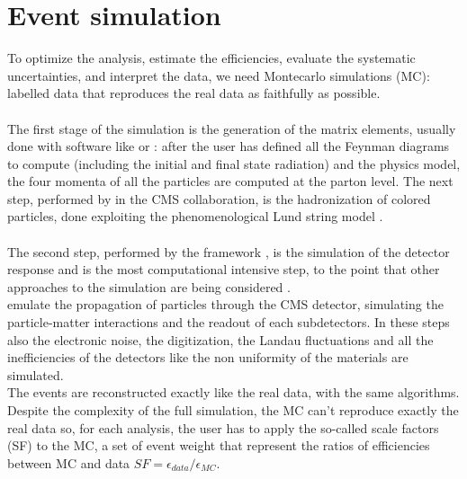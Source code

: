 \section{Event simulation}
To optimize the analysis, estimate the efficiencies, evaluate the systematic uncertainties, and interpret the data, we need Montecarlo simulations (MC): labelled data that reproduces the real data as faithfully as possible.\\
\\
The first stage of the simulation is the generation of the matrix elements, usually done with software like \MADGRAPH \ADDREF or \POWHEG \ADDREF : after the user has defined all the Feynman diagrams to compute (including the initial and final state radiation) and the physics model, the four momenta of all the particles are computed at the parton level.
The next step, performed by \PYTHIA \ADDREF in the CMS collaboration, is the hadronization of colored particles, done exploiting the phenomenological Lund string model \ADDREF .\\
\\
The second step, performed by the \GEANTfour framework \ADDREF, is the simulation of the detector response and is the most computational intensive step, to the point that other approaches to the simulation are being considered \ADDREF .\\
\GEANT emulate the propagation of particles through the CMS detector, simulating the particle-matter interactions and the readout of each subdetectors. In these steps also the electronic noise, the digitization, the Landau fluctuations and all the inefficiencies of the detectors like the non uniformity of the materials are simulated.\\
The events are reconstructed exactly like the real data, with the same algorithms.\\
Despite the complexity of the full simulation, the MC can't reproduce exactly the real data so, for each analysis, the user has to apply the so-called scale factors (SF) to the MC, a set of event weight that represent the ratios of efficiencies between MC and data $SF=\epsilon_{data}/\epsilon_{MC}$.

